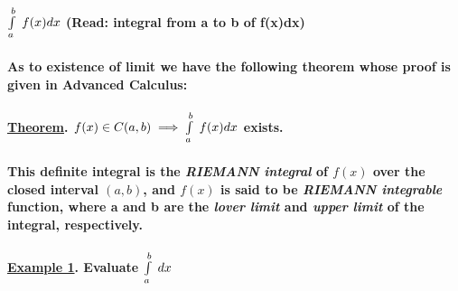 \documentclass[11pt]{amsbook}
\begin{document}
\paragraph{\hspace{1cm}$\int\limits_a^b \hspace{.1cm} f(x)dx$ \hspace{.5cm} (Read: integral from a to b of f(x)dx)\newline}

\paragraph{As to existence of limit we have the following theorem whose proof is given in Advanced Calculus:}


\paragraph{\underline{Theorem}. $f(x) \in C(a,b) \implies \int\limits_a^b \hspace{.1cm} f(x)dx$ exists.}


\paragraph{This definite integral is the \emph{RIEMANN integral} of $f(x)$ over the closed interval $(a, b)$, and $f(x)$ is said to be \emph{RIEMANN integrable} function, where a and b are the \emph{lover limit} and \emph{upper limit} of the integral, respectively.}

\paragraph{\underline{Example 1}. Evaluate \hspace{.2cm}$\int\limits_a^b \hspace{.1cm} dx$}
\end{document}
